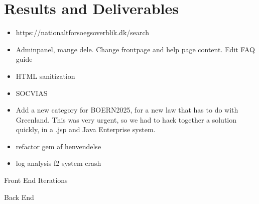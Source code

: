 \documentclass[../main.tex]{subfiles}
\begin{document}
\section{Results and Deliverables}

\begin{itemize}
    \item https://nationaltforsoegsoverblik.dk/search 
    \item Adminpanel, mange dele. Change frontpage and help page content. Edit FAQ guide 
    \item HTML sanitization 
    \item SOCVIAS 
    \item Add a new category for BOERN2025, for a new law that has to do with Greenland. This was very urgent, so we had to hack together a solution quickly, in a .jsp and Java Enterprise system. 
    \item refactor gem af henvendelse
    \item log analysis f2 system crash
\end{itemize}


Front End Iterations 

Back End 
\end{document}
